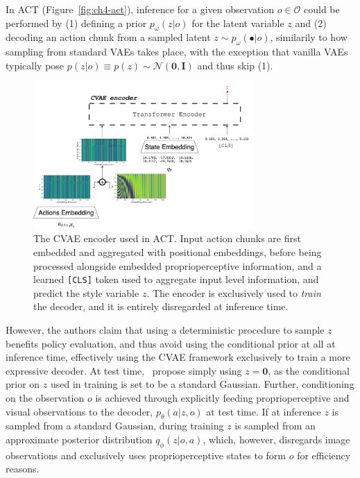 In ACT (Figure~\ref{fig:ch4-act}), inference for a given observation \( o \in \mathcal O \) could be performed by (1) defining a prior \( p_\omega(z \vert o) \) for the latent variable \( z \) and (2) decoding an action chunk from a sampled latent \( z \sim p_\omega(\bullet \vert o) \), similarily to how sampling from standard VAEs takes place, with the exception that vanilla VAEs typically pose \( p(z\vert o) \equiv p(z) \sim \mathcal N(\mathbf{0}, \mathbf{I}) \) and thus skip (1).

\begin{figure}
    \centering
    \includegraphics[width=0.75\textwidth]{figures/ch4/ch4-act-encoder.png}
    \caption{The CVAE encoder used in ACT. Input action chunks are first embedded and aggregated with positional embeddings, before being processed alongside embedded proprioperceptive information, and a learned \texttt{[CLS]} token used to aggregate input level information, and predict the style variable \( z \). The encoder is exclusively used to \emph{train} the decoder, and it is entirely disregarded at inference time.}
    \label{fig:ch4-act-encoder}
\end{figure}

However, the authors claim that using a deterministic procedure to sample \( z \) benefits policy evaluation, and thus avoid using the conditional prior at all at inference time, effectively using the CVAE framework exclusively to train a more expressive decoder.
At test time,~\citet{zhaoLearningFineGrainedBimanual2023} propose simply using \( z = \mathbf{0} \), as the conditional prior on \( z \) used in training is set to be a standard Gaussian.
Further, conditioning on the observation \( o \) is achieved through explicitly feeding proprioperceptive and visual observations to the decoder, \( p_\theta(a \vert z, o) \) at test time.
If at inference \( z \) is sampled from a standard Gaussian, during training \( z \) is sampled from an approximate posterior distribution \(q_\phi(z \vert o, a)\), which, however, disregards image observations and exclusively uses proprioperceptive states to form \( o \) for efficiency reasons.

